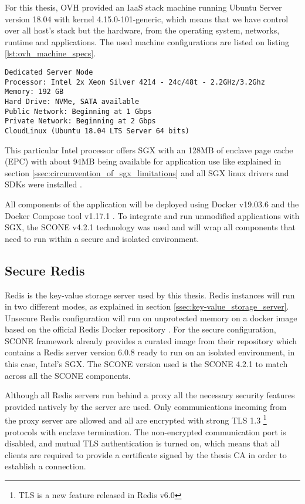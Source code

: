 For this thesis, OVH provided an IaaS stack machine running Ubuntu Server version 18.04 with kernel 4.15.0-101-generic, which means that we have control over all host's stack but the hardware, from the operating system, networks, runtime and applications. The used machine configurations are listed on listing \ref{lst:ovh_machine_specs}.

\lstset{numbers=none, caption=Machine Specifications, label=lst:machine_specs}
\label{lst:ovh_machine_specs}
\begin{lstlisting}
Dedicated Server Node
Processor: Intel 2x Xeon Silver 4214 - 24c/48t - 2.2GHz/3.2Ghz
Memory: 192 GB
Hard Drive: NVMe, SATA available
Public Network: Beginning at 1 Gbps
Private Network: Beginning at 2 Gbps
CloudLinux (Ubuntu 18.04 LTS Server 64 bits)
\end{lstlisting}

This particular Intel processor offers \gls{SGX} with an 128\gls{MB} of enclave page cache (\gls{EPC}) with about 94\gls{MB} being available for application use like explained in section \ref{ssec:circumvention_of_sgx_limitations} and all \gls{SGX} linux drivers and \glspl{SDK} were installed \cite{sgx_drivers:1, sgx_sdk:1}.

All components of the application will be deployed using Docker v19.03.6 \cite{docker:1} and the Docker Compose tool v1.17.1 \cite{docker-compose:1}. To integrate and run unmodified applications with \gls{SGX}, the SCONE v4.2.1 \cite{scone:1} technology was used and will wrap all components that need to run within a secure and isolated environment.

\subsection{Secure Redis}
\label{ssec:secure_redis}

Redis \cite{redis:1} is the key-value storage server used by this thesis. Redis instances will run in two different modes, as explained in section \ref{ssec:key-value_storage_server}. Unsecure Redis configuration will run on unprotected memory on a docker image based on the official Redis Docker repository \cite{redis:6}. For the secure configuration, SCONE framework already provides a curated image from their repository which contains a Redis server version 6.0.8 ready to run on an isolated environment, in this case, Intel's SGX. The SCONE version used is the SCONE 4.2.1 to match across all the SCONE components.

Although all Redis servers run behind a proxy all the necessary security features provided natively by the server are used. Only communications incoming from the proxy server are allowed and all are encrypted with strong \gls{TLS} 1.3 \footnote{TLS is a new feature released in Redis v6.0} protocols with enclave termination. The non-encrypted communication port is disabled, and mutual \gls{TLS} authentication is turned on, which means that all clients are required to provide a certificate signed by the thesis CA in order to establish a connection.

